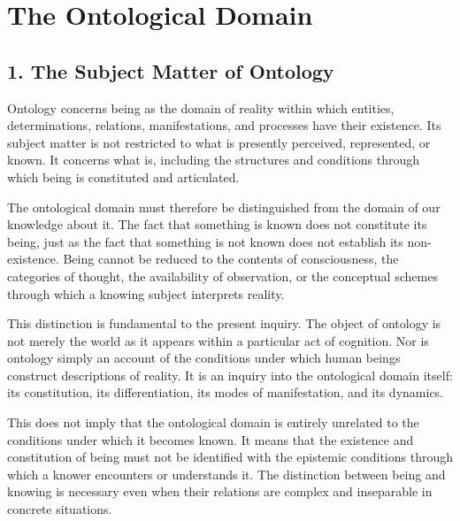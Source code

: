 
\cleardoublepage

\chapter*{The Ontological Domain}

{}


\section*{1. The Subject Matter of Ontology}

Ontology concerns being as the domain of reality within which
entities, determinations, relations, manifestations, and
processes have their existence. Its subject matter is not
restricted to what is presently perceived, represented, or
known. It concerns what is, including the structures and
conditions through which being is constituted and articulated.

The ontological domain must therefore be distinguished from
the domain of our knowledge about it. The fact that something
is known does not constitute its being, just as the fact that
something is not known does not establish its non-existence.
Being cannot be reduced to the contents of consciousness,
the categories of thought, the availability of observation,
or the conceptual schemes through which a knowing subject
interprets reality.

This distinction is fundamental to the present inquiry.
The object of ontology is not merely the world as it appears
within a particular act of cognition. Nor is ontology simply
an account of the conditions under which human beings
construct descriptions of reality. It is an inquiry into
the ontological domain itself: its constitution, its
differentiation, its modes of manifestation, and its dynamics.

This does not imply that the ontological domain is entirely
unrelated to the conditions under which it becomes known.
It means that the existence and constitution of being must
not be identified with the epistemic conditions through
which a knower encounters or understands it. The distinction
between being and knowing is necessary even when their
relations are complex and inseparable in concrete situations.

